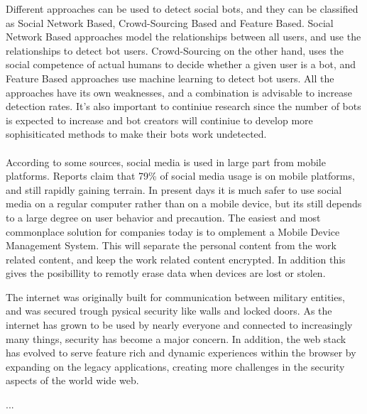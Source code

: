 Different approaches can be used to detect social bots, and they can be classified as Social Network Based, Crowd-Sourcing Based and Feature Based. Social Network Based approaches model the relationships between all users, and use the relationships to detect bot users. Crowd-Sourcing on the other hand, uses the social competence of actual humans to decide whether a given user is a bot, and Feature Based approaches use machine learning to detect bot users. All the approaches have its own weaknesses, and a combination is advisable to increase detection rates. It's also important to continiue research since the number of bots is expected to increase and bot creators will continiue to develop more sophisiticated methods to make their bots work undetected.
\\ \\
According to some sources, social media is used in large part from mobile platforms. Reports claim that 79\% of social media usage is on mobile platforms, and still rapidly gaining terrain. In present days it is much safer to use social media on a regular computer rather than on a mobile device, but its still depends to a large degree on user behavior and precaution. The easiest and most commonplace solution for companies today is to omplement a Mobile Device Management System. This will separate the personal content from the work related content, and keep the work related content encrypted. In addition this gives the posibillity to remotly erase data when devices are lost or stolen.

The internet was originally built for communication between military entities, and was secured trough pysical security like walls and locked doors. As the internet has grown to be used by nearly everyone and connected to increasingly many things, security has become a major concern. In addition, the web stack has evolved to serve feature rich and dynamic experiences within the browser by expanding on the legacy applications, creating more challenges in the security aspects of the world wide web.

...
	


